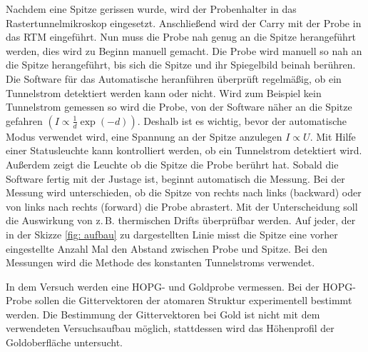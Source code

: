 Nachdem eine Spitze gerissen wurde, wird der Probenhalter in das Rastertunnelmikroskop eingesetzt.
Anschließend wird der Carry mit der Probe in das RTM eingeführt.
Nun muss die Probe nah genug an die Spitze herangeführt werden, dies wird zu Beginn
manuell gemacht. Die Probe wird manuell so nah an die Spitze herangeführt, bis sich
die Spitze und ihr Spiegelbild beinah berühren. Die Software für das Automatische
heranführen überprüft regelmäßig, ob ein Tunnelstrom detektiert werden kann oder nicht. %
Wird zum Beispiel kein Tunnelstrom gemessen so wird die Probe, von der Software %
näher an die Spitze gefahren $\left(I\propto \frac{1}{d}\exp{(-d)}\right)$.
Deshalb ist es wichtig, bevor der automatische
Modus verwendet wird, eine Spannung an der Spitze anzulegen $I\propto U$. Mit Hilfe einer
Statusleuchte kann kontrolliert werden, ob ein Tunnelstrom detektiert wird. Außerdem zeigt die Leuchte
ob die Spitze die Probe berührt hat.
Sobald die Software fertig mit der Justage ist, beginnt automatisch die Messung.
Bei der Messung wird unterschieden, ob die Spitze von rechts nach links (backward) oder von links nach rechts (forward) %
die Probe abrastert. Mit der Unterscheidung soll die Auswirkung von z.\,B. thermischen Drifts überprüfbar werden. %
 Auf jeder, der in der Skizze \ref{fig: aufbau} zu dargestellten Linie misst die Spitze eine %
vorher eingestellte Anzahl Mal den Abstand zwischen Probe und Spitze.
Bei den Messungen wird die Methode des konstanten Tunnelstroms verwendet.

In dem Versuch werden eine HOPG- und Goldprobe vermessen.
Bei der HOPG-Probe sollen die Gittervektoren der atomaren Struktur
experimentell bestimmt werden. Die Bestimmung der Gittervektoren
bei Gold ist nicht mit dem verwendeten Versuchsaufbau möglich, stattdessen %
wird das Höhenprofil der Goldoberfläche untersucht.
